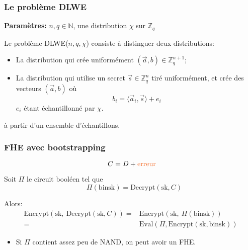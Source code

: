 \documentclass[11pt,xcolor={usenames,dvipsnames}]{beamer}
\newcommand{\ZZq}{\mathbb{Z}_q}
\begin{document}
\begin{frame} 
\frametitle{Le problème DLWE}
\textbf{Paramètres:} $n, q\in \mathbb{N}$, une distribution $\chi$ sur $\ZZq$

Le problème DLWE($n,q,\chi$) consiste à distinguer deux distributions:
\begin{itemize}
\item La distribution qui crée uniformément $(\vec{a}, b) \in \ZZq^{n+1}$;
\item La distribution qui utilise un secret $\vec{s}\in \ZZq^n$ tiré uniformément, 
et crée des vecteurs $(\vec{a}, b)$ où
\[ b_i = \langle \vec{a}_i, \vec{s} \rangle + e_i \] 
$e_i$ étant échantillonné par $\chi$.
\end{itemize}
à partir d'un ensemble d'échantillons.
\end{frame} 


\begin{frame} 
\frametitle{FHE avec bootstrapping}
\[ C = D + \text{\textcolor{Orange}{erreur}} \]
  \noindent
  \begin{center}
      \begin{tikzpicture}[scale = 1, transform shape]
      	
      \end{tikzpicture}
  \end{center}
  \noindent
  \vspace{-0.7cm}


\pause
Soit $\Pi$ le circuit booléen tel que 
\[\quad\Pi(\text{binsk})= \text{Decrypt}\left(\text{sk}, C\right) \]

\pause
Alors:
\begin{align*}
\text{Encrypt}\left(\text{sk},\: \text{Decrypt}\left(\text{sk},C\right)\right) 
=& \text{Encrypt}\left(\text{sk},\: \Pi(\text{binsk})\right) \\
=& \text{Eval}\left(\Pi, \text{Encrypt}(\text{sk}, \text{binsk})\right)
\end{align*}
\vspace{-0.5cm}
\begin{itemize}
\item Si $\Pi$ contient assez peu de NAND, on peut avoir un FHE.
\end{itemize}

\end{frame} 
\end{document}
